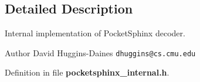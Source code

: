 \subsection{Detailed Description}
Internal implementation of Pocket\-Sphinx decoder. \begin{DoxyAuthor}{Author}
David Huggins-\/\-Daines {\tt dhuggins@cs.\-cmu.\-edu} 
\end{DoxyAuthor}


Definition in file {\bf pocketsphinx\-\_\-internal.\-h}.

